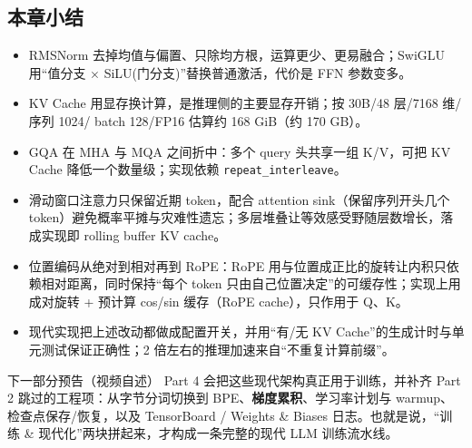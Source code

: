 \subsection{本章小结}

\begin{itemize}
\item RMSNorm 去掉均值与偏置、只除均方根，运算更少、更易融合；SwiGLU 用“值分支 $\times$ SiLU(门分支)”替换普通激活，代价是 FFN 参数变多。
\item KV Cache 用显存换计算，是推理侧的主要显存开销；按 30B/48 层/7168 维/序列 1024/ batch 128/FP16 估算约 168 GiB（约 170 GB）。
\item GQA 在 MHA 与 MQA 之间折中：多个 query 头共享一组 K/V，可把 KV Cache 降低一个数量级；实现依赖 \texttt{repeat\_interleave}。
\item 滑动窗口注意力只保留近期 token，配合 attention sink（保留序列开头几个 token）避免概率平摊与灾难性遗忘；多层堆叠让等效感受野随层数增长，落成实现即 rolling buffer KV cache。
\item 位置编码从绝对到相对再到 RoPE：RoPE 用与位置成正比的旋转让内积只依赖相对距离，同时保持“每个 token 只由自己位置决定”的可缓存性；实现上用成对旋转 + 预计算 cos/sin 缓存（RoPE cache），只作用于 Q、K。
\item 现代实现把上述改动都做成配置开关，并用“有/无 KV Cache”的生成计时与单元测试保证正确性；2 倍左右的推理加速来自“不重复计算前缀”。
\end{itemize}

\begin{knowledgebox}{下一部分预告（视频自述）}
Part 4 会把这些现代架构真正用于训练，并补齐 Part 2 跳过的工程项：从字节分词切换到 BPE、\textbf{梯度累积}、学习率计划与 warmup、检查点保存/恢复，以及 TensorBoard / Weights \& Biases 日志。也就是说，“训练 \& 现代化”两块拼起来，才构成一条完整的现代 LLM 训练流水线。
\end{knowledgebox}
